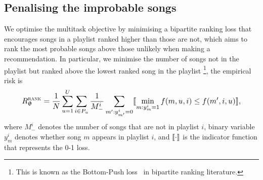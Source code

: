 \subsection{Penalising the improbable songs}
\label{ssec:bploss}

%
%
We optimise the multitask objective by minimising a bipartite ranking loss 
that encourages songs in a playlist ranked higher than those are not, 
which aims to rank the most probable songs above those unlikely when making a recommendation.
In particular, we minimise the number of songs not in the playlist but ranked above the lowest ranked song in the playlist
\footnote{This is known as the Bottom-Push loss~\cite{rudin2009p} in bipartite ranking literature.},
\ie the %
empirical risk is
\begin{equation}
\label{eq:bprisk}
\resizebox{.9\linewidth}{!}{$\displaystyle
R_{\upthetabm}^{\textsc{rank}} = \frac{1}{N} \sum_{u=1}^U \sum_{i \in P_u} \frac{1}{M_-^i} \sum_{m': y_{m'}^i = 0} 
\llb \min_{m: y_m^i = 1} f(m, u, i) \le f(m', i, u) \rrb,
$}
\end{equation}
where $M_-^i$ denotes the number of songs that are not in playlist $i$,
binary variable $y_m^i$ denotes whether song $m$ appears in playlist $i$,
and $\llbracket \cdot \rrbracket$ is the indicator function that represents the 0-1 loss.

